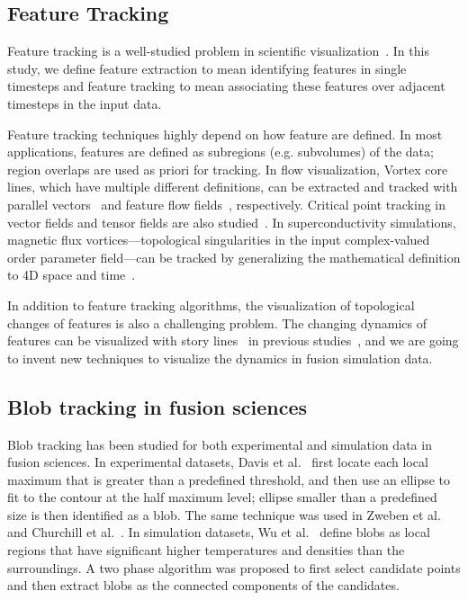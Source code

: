 \subsection{Feature Tracking}

Feature tracking is a well-studied problem in scientific visualization~\cite{PostVHLD2003}.  In this study, we define feature extraction to mean identifying features in single timesteps and feature tracking to mean associating these features over adjacent timesteps in the input data.  

Feature tracking techniques highly depend on how feature are defined.  In most applications, features are defined as subregions (e.g. subvolumes) of the data; region overlaps are used as priori for tracking.  In flow visualization, Vortex core lines, which have multiple different definitions, can be extracted and tracked with parallel vectors~\cite{PeikertR99} and feature flow fields~\cite{TheiselS03, WeinkaufTGP11}, respectively.  Critical point tracking in vector fields and tensor fields are also studied~\cite{GarthTS04, TricocheSH01, TricocheWSH02, ReininghausKWH12}.  In superconductivity simulations, magnetic flux vortices---topological singularities in the input complex-valued order parameter field---can be tracked by generalizing the mathematical definition to 4D space and time~\cite{GuoPPKG16, GuoPG17, PhillipsGPKG16, PhillipsPKG15}.  

In addition to feature tracking algorithms, the visualization of topological changes of features is also a challenging problem.  The changing dynamics of features can be visualized with story lines~\cite{TanahashiM12} in previous studies~\cite{GuoPPKG16}, and we are going to invent new techniques to visualize the dynamics in fusion simulation data.  


\subsection{Blob tracking in fusion sciences}

Blob tracking has been studied for both experimental and simulation data in fusion sciences.  In experimental datasets, Davis et al.~\cite{DavisKMRSZ14} first locate each local maximum that is greater than a predefined threshold, and then use an ellipse to fit to the contour at the half maximum level; ellipse smaller than a predefined size is then identified as a blob.  The same technique was used in Zweben et al.~\cite{Zweben15} and Churchill et al.~\cite{Churchill17}.  In simulation datasets, Wu et al.~\cite{WuWSCCSCK16} define blobs as local regions that have significant higher temperatures and densities than the surroundings.  A two phase algorithm was proposed to first select candidate points and then extract blobs as the connected components of the candidates.  

